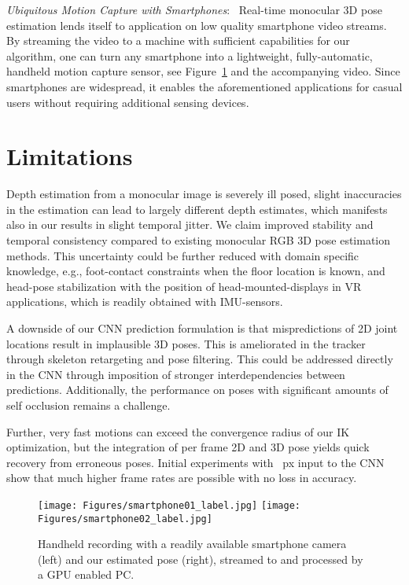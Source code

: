 \documentclass[acmtog]{acmart}
\newcommand{\parahead}[1]{\vspace{5pt}\noindent\emph{#1}:\ }
\newcommand{\change}[1]{{#1}}
\begin{document}
\parahead{\change{Ubiquitous Motion Capture with Smartphones}}
Real-time monocular 3D pose estimation lends itself to application on \change{low quality} smartphone video streams.
By streaming the video to a machine with sufficient capabilities for our algorithm, one can turn any smartphone into a lightweight, fully-automatic, handheld motion capture sensor, see Figure~\ref{fig:smartphone-capture} and the accompanying video.
Since smartphones are widespread, it enables the aforementioned applications for casual users without requiring additional sensing devices.



\section{Limitations}


Depth estimation from a monocular image is severely ill posed, slight inaccuracies in the estimation can lead to largely different depth estimates, which manifests also in our results in slight temporal jitter.
We claim improved stability and temporal consistency compared to existing monocular RGB 3D pose estimation methods.
This uncertainty could be further reduced with domain specific knowledge, e.g., foot-contact constraints when the floor location is known, and head-pose stabilization with the position of head-mounted-displays in VR applications, which is readily obtained with IMU-sensors. 

A downside of our CNN prediction formulation is that mispredictions of 2D joint locations result in implausible 3D poses. This is ameliorated in the tracker through skeleton retargeting and pose filtering. This could be addressed directly in the CNN through imposition of stronger interdependencies between predictions. Additionally, the performance on poses with significant amounts of self occlusion remains a challenge.  

Further, very fast motions can exceed the convergence radius of our IK optimization, but the integration of per frame 2D and 3D pose yields quick recovery from erroneous poses. \change{Initial experiments with ~px input to the CNN show that much higher frame rates are possible with no loss in accuracy.}

\begin{figure}[]
\centering
\texttt{[image: Figures/smartphone01\_label.jpg]}
\vspace{0.2cm}
\texttt{[image: Figures/smartphone02\_label.jpg]}
\caption{Handheld recording with a readily available smartphone camera (left) and our estimated pose (right), streamed to and processed by a GPU enabled PC.}
\vspace{-0.5cm}

\label{fig:smartphone-capture}
\end{figure}
\end{document}
